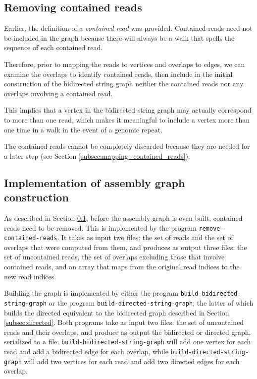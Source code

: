 \documentclass[10pt]{article}
\newcommand{\Subsection}[1]{Section \ref{#1}}
\newcommand{\KeyTerm}[1]{{\it #1}}
\newcommand{\ProgramName}[1]{{\tt #1}}
\begin{document}
\subsection{Removing contained reads}

\label{subsec:removing_contained_reads}

Earlier, the definition of a \KeyTerm{contained read} was provided.  Contained
reads need not be included in the graph because there will always be a walk that
spells the sequence of each contained read.

Therefore, prior to mapping the reads to vertices and overlaps to edges, we can
examine the overlaps to identify contained reads, then include in the initial
construction of the bidirected string graph neither the contained reads nor any
overlaps involving a contained read.

This implies that a vertex in the bidirected string graph may actually
correspond to more than one read, which makes it meaningful to include a vertex
more than one time in a walk in the event of a genomic repeat.

The contained reads cannot be completely discarded because they are needed for a
later step (see \Subsection{subsec:mapping_contained_reads}).

\subsection{Implementation of assembly graph construction}

As described in \Subsection{subsec:removing_contained_reads}, before the
assembly graph is even built, contained reads need to be removed.  This is
implemented by the program \ProgramName{remove-contained-reads}.  It takes as
input two files: the set of reads and the set of overlaps that were computed
from them, and produces as output three files: the set of uncontained reads, the
set of overlaps excluding those that involve contained reads, and an array that
maps from the original read indices to the new read indices.

Building the graph is implemented by either the program
\ProgramName{build-bidirected-string-graph} or the program
\ProgramName{build-directed-string-graph}, the latter of which builds the
directed equivalent to the bidirected graph described in
\Subsection{subsec:directed}.  Both programs take as input two files: the set of
uncontained reads and their overlaps, and produce as output the bidirected or
directed graph, serialized to a file.
\ProgramName{build-bidirected-string-graph} will add one vertex for each read
and add a bidirected edge for each overlap, while
\ProgramName{build-directed-string-graph} will add two vertices for each read and
add two directed edges for each overlap.
\end{document}
